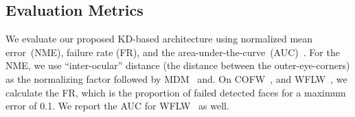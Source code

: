\documentclass[times,twocolumn,final,authoryear]{elsarticle}
\begin{document}
\subsection{Evaluation Metrics} \label{sec:vel_metrics}
We evaluate our proposed KD-based architecture using normalized mean error~(NME), failure rate (FR), and the area-under-the-curve~(AUC)~\cite{yang2015empirical}. For the NME, we use “inter-ocular” distance (the distance between the outer-eye-corners) as the normalizing factor followed by MDM~\cite{trigeorgis2016mnemonic} and\cite{sagonas2013300}. On COFW~\cite{burgos2013robust}, and WFLW~\cite{wu2018look}, we calculate the FR, which is the proportion of failed detected faces for a maximum error of 0.1. We report the AUC for WFLW~\cite{wu2018look} as well.
\begin{table}[t!] 
\caption{NME (in \%) of 68-point landmarks detection on 300W~\cite{sagonas2013300}.}
\label{tbl:tbl_results_300w}
\centering
\small
{}
\end{table}
\end{document}
